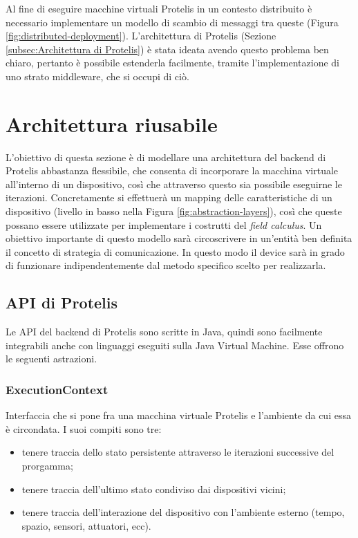 Al fine di eseguire macchine virtuali Protelis in un contesto distribuito è
necessario implementare un modello di scambio di messaggi tra queste (Figura
\ref{fig:distributed-deployment}).  L'architettura di Protelis (Sezione
\ref{subsec:Architettura di Protelis}) è stata ideata avendo questo problema ben
chiaro, pertanto è possibile estenderla facilmente, tramite l'implementazione di
uno strato middleware, che si occupi di ciò.


\section{Architettura riusabile}
\label{sec:model-def}
L'obiettivo di questa sezione è di modellare una architettura del backend di
Protelis abbastanza flessibile, che consenta di incorporare la macchina virtuale
all'interno di un dispositivo, così che attraverso questo sia possibile
eseguirne le iterazioni. Concretamente si effettuerà un mapping delle
caratteristiche di un dispositivo (livello in basso nella Figura
\ref{fig:abstraction-layers}), così che queste possano essere utilizzate per
implementare i costrutti del \textit{field calculus}. Un obiettivo importante di
questo modello sarà circoscrivere in un'entità ben definita il concetto di
strategia di comunicazione. In questo modo il device sarà in grado di funzionare
indipendentemente dal metodo specifico scelto per realizzarla.

\subsection{API di Protelis}
Le API del backend di Protelis sono scritte in Java, quindi sono facilmente
integrabili anche con linguaggi eseguiti sulla Java Virtual Machine. Esse
offrono le seguenti astrazioni.

\subsubsection{ExecutionContext}
Interfaccia che si pone fra una macchina virtuale Protelis e l'ambiente da cui
essa è circondata. I suoi compiti sono tre:
\begin{itemize}
\item tenere traccia dello stato persistente attraverso le iterazioni successive
  del prorgamma;
\item tenere traccia dell'ultimo stato condiviso dai dispositivi vicini;
\item tenere traccia dell'interazione del dispositivo con l'ambiente esterno
  (tempo, spazio, sensori, attuatori, ecc).
\end{itemize}

